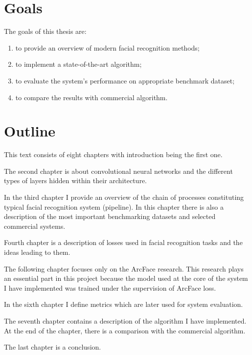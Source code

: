 \section{Goals}\label{sec:goals}
The goals of this thesis are:
\begin{enumerate}
    \item to provide an overview of modern facial recognition methods;
    \item to implement a state-of-the-art algorithm;
    \item to evaluate the system's performance on appropriate benchmark dataset;
    \item to compare the results with commercial algorithm.
\end{enumerate}

\section{Outline}\label{sec:outline}
This text consists of eight chapters with introduction being the first one.

The second chapter is about convolutional neural networks and the different types of layers hidden within their
architecture.

In the third chapter I provide an overview of the chain of processes constituting typical facial recognition system
(pipeline).
In this chapter there is also a description of the most important benchmarking datasets and selected commercial
systems.

Fourth chapter is a description of losses used in facial recognition tasks and the ideas leading to them.

The following chapter focuses only on the ArcFace research.
This research plays an essential part in this project because the model used at the core of the system I have
implemented was trained under the supervision of ArcFace loss.

In the sixth chapter I define metrics which are later used for system evaluation.

The seventh chapter contains a description of the algorithm I have implemented.
At the end of the chapter, there is a comparison with the commercial algorithm.

The last chapter is a conclusion.